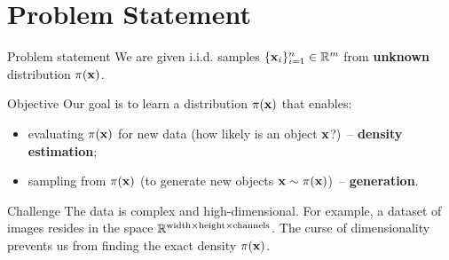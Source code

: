 \documentclass{beamer}
\begin{document}
\section{Problem Statement}
\begin{frame}{Problem statement}
	We are given i.i.d. samples $\{\mathbf{x}_i\}_{i=1}^n \in \mathbb{R}^m$ from \textbf{unknown} distribution $\pi(\mathbf{x})$.
	
	\begin{block}{Objective}
		Our goal is to learn a distribution $\pi(\mathbf{x})$ that enables: 
		\begin{itemize}
		    \item evaluating $\pi(\mathbf{x})$ for new data (how likely is an object $\mathbf{x}$?)~-- \textbf{density estimation};
		    \item sampling from $\pi(\mathbf{x})$ (to generate new objects $\mathbf{x} \sim \pi(\mathbf{x})$)~-- \textbf{generation}.
		\end{itemize}
	\end{block}
	\begin{block}{Challenge}
		The data is complex and high-dimensional. For example, a dataset of images resides in the space $\mathbb{R}^{\text{width} \times \text{height} \times \text{channels}}$. The curse of dimensionality prevents us from finding the exact density $\pi(\mathbf{x})$. 
	\end{block}
\end{frame}
\end{document}
